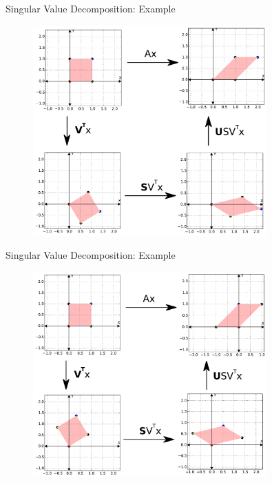 \documentclass{beamer}
\begin{document}
\begin{frame}{Singular Value Decomposition: Example}

\begin{figure}[t]
	\centering
    \includegraphics[width=0.8\textwidth]{2DShear.pdf}
\end{figure}


\end{frame}


\begin{frame}{Singular Value Decomposition: Example}

\begin{figure}[t]
	\centering
    \includegraphics[width=0.8\textwidth]{2DFlipSkewAll.pdf}
\end{figure}


\end{frame}
\end{document}
